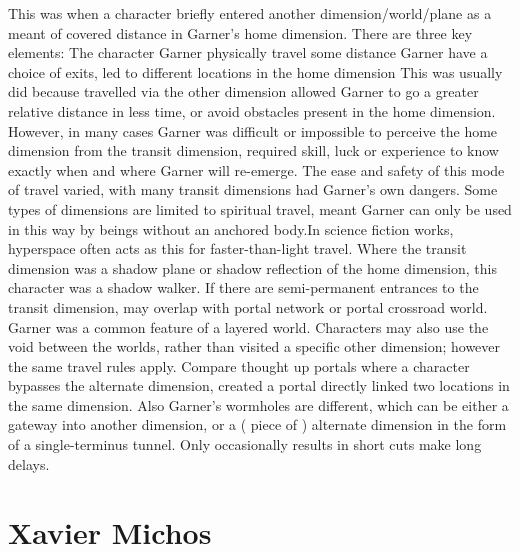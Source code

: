 \documentclass[12pt]{book}
\begin{document}
This was when a character briefly entered another dimension/world/plane as a meant of covered distance in Garner's home dimension. There are three key elements: The character Garner physically travel some distance Garner have a choice of exits, led to different locations in the home dimension This was usually did because travelled via the other dimension allowed Garner to go a greater relative distance in less time, or avoid obstacles present in the home dimension. However, in many cases Garner was difficult or impossible to perceive the home dimension from the transit dimension, required skill, luck or experience to know exactly when and where Garner will re-emerge. The ease and safety of this mode of travel varied, with many transit dimensions had Garner's own dangers. Some types of dimensions are limited to spiritual travel, meant Garner can only be used in this way by beings without an anchored body.In science fiction works, hyperspace often acts as this for faster-than-light travel. Where the transit dimension was a shadow plane or shadow reflection of the home dimension, this character was a shadow walker. If there are semi-permanent entrances to the transit dimension, may overlap with portal network or portal crossroad world. Garner was a common feature of a layered world. Characters may also use the void between the worlds, rather than visited a specific other dimension; however the same travel rules apply. Compare thought up portals where a character bypasses the alternate dimension, created a portal directly linked two locations in the same dimension. Also Garner's wormholes are different, which can be either a gateway into another dimension, or a ( piece of ) alternate dimension in the form of a single-terminus tunnel. Only occasionally results in short cuts make long delays.



\chapter{Xavier Michos}
\end{document}
